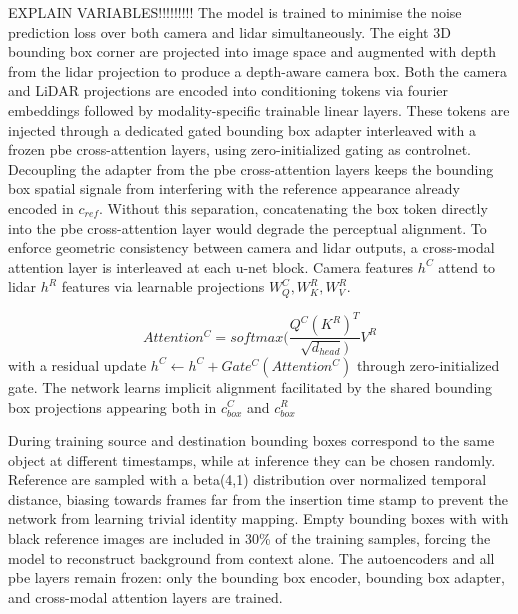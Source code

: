 EXPLAIN VARIABLES!!!!!!!!!
The model is trained to minimise the noise prediction loss over both camera and \gls{lidar} simultaneously. The eight 3D bounding box corner are projected into image space and augmented with depth from the \gls{lidar} projection to produce a depth-aware camera box. 
Both the camera and LiDAR projections are encoded into conditioning tokens via \gls{fourier embeddings} followed by modality-specific trainable linear layers.
These tokens are injected through a dedicated gated bounding box adapter interleaved with a frozen \gls{pbe} cross-attention layers, using zero-initialized gating as \gls{controlnet}. 
Decoupling the adapter from the \gls{pbe} cross-attention layers keeps the bounding box spatial signale from interfering with the reference appearance already encoded in $c_{ref}$. 
Without this separation, concatenating the box token directly into the \gls{pbe} cross-attention layer would degrade the perceptual alignment.  
To enforce geometric consistency between camera and \gls{lidar} outputs, a cross-modal attention layer is interleaved at each \gls{u-net} block.
Camera features $h^C$ attend to \gls{lidar} $h^R$  features via learnable projections $W_Q^C, W_K^R, W_V^R$.

\begin{equation}
    \label{eq:cross-modal-attention}
    Attention^C = softmax(\frac{Q^C(K^R)^T} {\sqrt{d_{head}})} V^R
\end{equation}
with a residual update $h^C \leftarrow h^C + Gate^C(Attention^C)$ through zero-initialized gate. The network learns implicit alignment facilitated by the shared bounding box projections appearing both in 
$c_{box}^C$ and $c_{box}^R$ 

During training source and destination bounding boxes correspond to the same object at different timestamps, while at inference they can be chosen randomly. Reference are sampled with a \gls{beta(4,1)} 
distribution over normalized temporal distance, biasing towards frames far from the insertion time stamp to prevent the network from learning trivial identity mapping. Empty bounding boxes with 
with black reference images are included in 30\% of the training samples, forcing the model to reconstruct background from context alone. The autoencoders and all \gls{pbe} layers remain frozen: 
only the bounding box encoder, bounding box adapter, and cross-modal attention layers are trained. 
